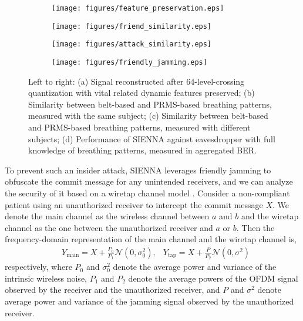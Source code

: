 \begin{figure*}[t]
\begin{subfigure}[t]{0.24\textwidth}
\texttt{[image: figures/feature\_preservation.eps]}
\end{subfigure}
\hspace{\fill}
\begin{subfigure}[t]{0.24\textwidth}
\texttt{[image: figures/friend\_similarity.eps]}
\end{subfigure}
\hspace{\fill}
\begin{subfigure}[t]{0.24\textwidth}
\texttt{[image: figures/attack\_similarity.eps]}
\end{subfigure}
\hspace{\fill}
\begin{subfigure}[t]{0.24\textwidth}
\texttt{[image: figures/friendly\_jamming.eps]}
\end{subfigure}
\caption{Left to right: (a) Signal reconstructed after 64-level-crossing quantization with vital related dynamic features preserved; (b)  Similarity between belt-based and PRMS-based breathing patterns, measured with the same subject; (c) Similarity between belt-based and PRMS-based breathing patterns, measured with different subjects; (d) Performance of SIENNA against eavesdropper with full knowledge of breathing patterns, measured in aggregated BER.}
\label{fig:key evolution}
\vspace{-15pt}
\end{figure*}

To prevent such an insider attack, SIENNA leverages friendly jamming to obfuscate the commit message for any unintended receivers, and we can analyze the security of it based on a wiretap channel model \cite{LiangCompoundWiretapChannels2009}. Consider a non-compliant patient using an unauthorized receiver to intercept the commit message $X$. We denote the main channel as the wireless channel between $a$ and $b$ and the wiretap channel as the one between the unauthorized receiver and $a$ or $b$. 
Then the frequency-domain representation of the main channel and the wiretap channel is,
\begin{align*}
    & Y_{\text{main}} = X + \frac{P_0}{P_1}\mathcal{N}(0, \sigma^2_0), & Y_{\text{tap}} = X + \frac{P}{P_2}\mathcal{N}(0, \sigma^2)
\end{align*}
respectively, where $P_0$ and $\sigma^2_0$ denote the average power and variance of the intrinsic wireless noise, $P_1$ and $P_2$ denote the average powers of the OFDM signal observed by the receiver and the unauthorized receiver, and $P$ and $\sigma^2$ denote average power and variance of the jamming signal observed by the unauthorized receiver. 

